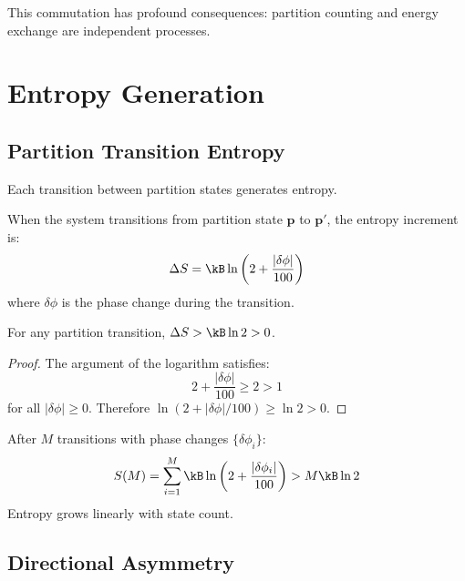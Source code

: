 This commutation has profound consequences: partition counting and energy exchange are independent processes.



\section{Entropy Generation}
\label{sec:entropy}

\subsection{Partition Transition Entropy}

Each transition between partition states generates entropy.

\begin{definition}
\label{def:entropy}
When the system transitions from partition state $\mathbf{p}$ to $\mathbf{p}'$, the entropy increment is:
\begin{equation}
    \Delta S = \kB \ln\left(2 + \frac{|\delta\phi|}{100}\right)
\end{equation}
where $\delta\phi$ is the phase change during the transition.
\end{definition}

\begin{theorem}
\label{thm:positive}
For any partition transition, $\Delta S > \kB \ln 2 > 0$.
\end{theorem}

\begin{proof}
The argument of the logarithm satisfies:
\begin{equation}
    2 + \frac{|\delta\phi|}{100} \geq 2 > 1
\end{equation}
for all $|\delta\phi| \geq 0$. Therefore $\ln(2 + |\delta\phi|/100) \geq \ln 2 > 0$.
\end{proof}

\begin{corollary}
After $M$ transitions with phase changes $\{\delta\phi_i\}$:
\begin{equation}
    S(M) = \sum_{i=1}^{M} \kB \ln\left(2 + \frac{|\delta\phi_i|}{100}\right) > M \kB \ln 2
\end{equation}
Entropy grows linearly with state count.
\end{corollary}

\subsection{Directional Asymmetry}

